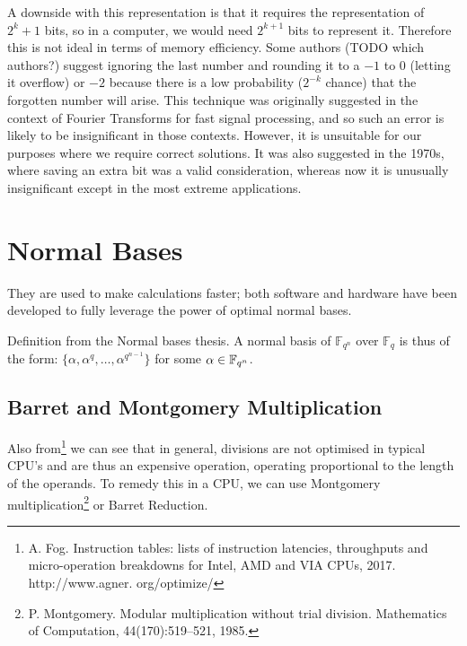 A downside with this representation is that it requires the representation of $2^k + 1$ bits, so in a computer, we would need $2^{k+1}$ bits to represent it. Therefore this is not ideal in terms of memory efficiency. Some authors (TODO which authors?) suggest ignoring the last number and rounding it to a $-1$ to $0$ (letting it overflow) or $-2$ because there is a low probability ($2^{-k}$ chance) that the forgotten number will arise. This technique was originally suggested in the context of Fourier Transforms for fast signal processing, and so such an error is likely to be insignificant in those contexts. However, it is unsuitable for our purposes where we require correct solutions. It was also suggested in the 1970s, where saving an extra bit was a valid consideration, whereas now it is unusually insignificant except in the most extreme applications.


\section{Normal Bases}
They are used to make calculations faster; both software and hardware have been developed to fully leverage the power of optimal normal bases.

Definition from the Normal bases thesis.
A normal basis of $\mathbb{F}_{q^n}$ over $\mathbb{F}_q$ is thus of the form: $\{\alpha,\alpha^q,\ldots ,\alpha^{q^{n-1}}\}$ for some $\alpha \in \mathbb{F}_{q^n}$.

\subsection{Barret and Montgomery Multiplication}%
\label{sub:Barret and Montgomery Multiplication}

Also from\footnote{A. Fog. Instruction tables: lists of instruction latencies, throughputs and micro-operation breakdowns for Intel, AMD and VIA CPUs, 2017. http://www.agner. org/optimize/} we can see that in general, divisions are not optimised in typical CPU's and are thus an expensive operation, operating proportional to the length of the operands. To remedy this in a CPU, we can use Montgomery multiplication\footnote{P. Montgomery. Modular multiplication without trial division. Mathematics of Computation, 44(170):519–521, 1985.} or Barret Reduction.
